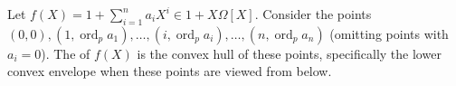 Let $f(X) = 1 + \sum_{i=1}^n a_i X^i \in 1 + X\Omega[X]$. Consider the points $(0,0), (1,\operatorname{ord}_p a_1), \ldots, (i,\operatorname{ord}_p a_i), \ldots, (n,\operatorname{ord}_p a_n)$ (omitting points with $a_i = 0$). The  of $f(X)$ is the convex hull of these points, specifically the lower convex envelope when these points are viewed from below.